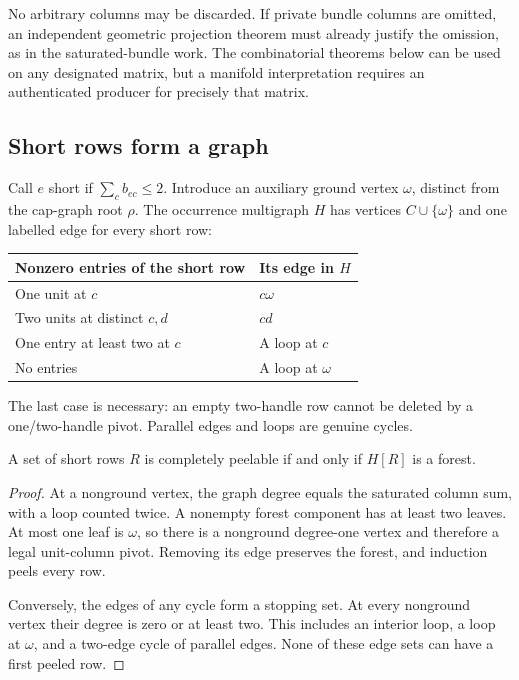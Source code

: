 No arbitrary columns may be discarded. If private bundle columns are
omitted, an independent geometric projection theorem must already justify
the omission, as in the saturated-bundle work. The combinatorial theorems
below can be used on any designated matrix, but a manifold interpretation
requires an authenticated producer for precisely that matrix.

\subsection{Short rows form a graph}

Call $e$ short if $\sum_c b_{ec}\leq2$. Introduce an auxiliary ground
vertex $\omega$, distinct from the cap-graph root $\rho$. The occurrence
multigraph $H$ has vertices $C\cup\{\omega\}$ and one labelled edge for
every short row:
\begin{center}
\begin{tabular}{@{}ll@{}}
\toprule
Nonzero entries of the short row & Its edge in $H$\\
\midrule
One unit at $c$ & $c\omega$\\
Two units at distinct $c,d$ & $cd$\\
One entry at least two at $c$ & A loop at $c$\\
No entries & A loop at $\omega$\\
\bottomrule
\end{tabular}
\end{center}
The last case is necessary: an empty two-handle row cannot be deleted by a
one/two-handle pivot. Parallel edges and loops are genuine cycles.

\begin{lemma}
\label{lem:graphic}
A set of short rows $R$ is completely peelable if and only if $H[R]$ is a
forest.
\end{lemma}

\begin{proof}
At a nonground vertex, the graph degree equals the saturated column sum,
with a loop counted twice. A nonempty forest component has at least two
leaves. At most one leaf is $\omega$, so there is a nonground degree-one
vertex and therefore a legal unit-column pivot. Removing its edge preserves
the forest, and induction peels every row.

Conversely, the edges of any cycle form a stopping set. At every nonground
vertex their degree is zero or at least two. This includes an interior
loop, a loop at $\omega$, and a two-edge cycle of parallel edges. None of
these edge sets can have a first peeled row.
\end{proof}

